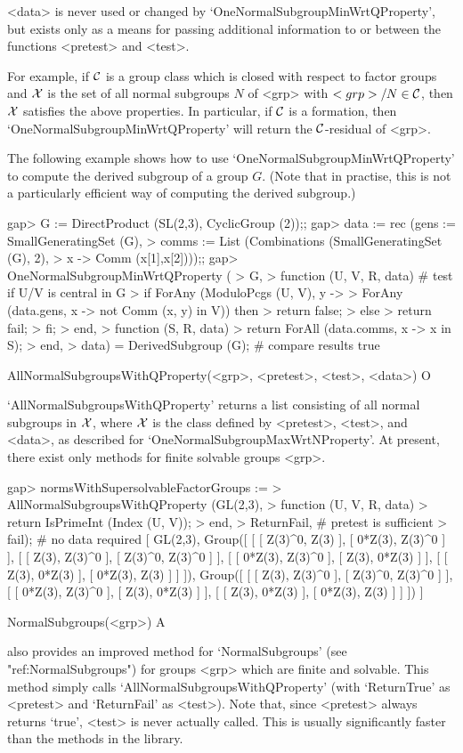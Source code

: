 <data> is never used or changed by `OneNormalSubgroupMinWrtQProperty', but
exists only as a means for passing additional information to or between
the functions <pretest> and <test>.

For example, if $\cal C$ is a group class which is closed with respect to
factor groups and $\cal X$ is the set of all normal subgroups $N$ of <grp>
with $<grp>/N \in \cal C$, then $\cal X$ satisfies the above properties. In
particular, if $\cal C$ is a formation, then
`OneNormalSubgroupMinWrtQProperty' will return the $\cal C$-residual of
<grp>.

The following example shows how to use `OneNormalSubgroupMinWrtQProperty' to
compute the derived subgroup of a group $G$. (Note that in practise, this 
is not a particularly efficient way of computing the derived subgroup.)

\beginexample
gap> G := DirectProduct (SL(2,3), CyclicGroup (2));;
gap> data := rec (gens := SmallGeneratingSet (G),
>    comms := List (Combinations (SmallGeneratingSet (G), 2), 
>       x -> Comm (x[1],x[2])));;
gap> OneNormalSubgroupMinWrtQProperty (
>    G,
>    function (U, V, R, data) # test if U/V is central in G
>        if ForAny (ModuloPcgs (U, V), y ->
>           ForAny (data.gens, x -> not Comm (x, y) in V)) then 
>           return false;
>        else
>           return fail;
>        fi;
>     end,
>     function (S, R, data)
>        return ForAll (data.comms, x -> x in S);
>     end,
>     data) = DerivedSubgroup (G); # compare results
true
\endexample       

\>AllNormalSubgroupsWithQProperty(<grp>, <pretest>, <test>, <data>) O

`AllNormalSubgroupsWithQProperty' returns a list consisting of all normal
subgroups in $\cal X$, where $\cal X$ is the class defined by <pretest>,
<test>, and <data>, as described for `OneNormalSubgroupMaxWrtNProperty'. 
At present, there exist only methods for finite solvable groups <grp>.

\beginexample
gap> normsWithSupersolvableFactorGroups :=
> AllNormalSubgroupsWithQProperty (GL(2,3),
>    function (U, V, R, data)
>       return IsPrimeInt (Index (U, V));
>    end,
>    ReturnFail, # pretest is sufficient
>    fail); # no data required
[ GL(2,3), 
  Group([ [ [ Z(3)^0, Z(3) ], [ 0*Z(3), Z(3)^0 ] ], [ [ Z(3), Z(3)^0 ], 
          [ Z(3)^0, Z(3)^0 ] ], [ [ 0*Z(3), Z(3)^0 ], [ Z(3), 0*Z(3) ] ], 
      [ [ Z(3), 0*Z(3) ], [ 0*Z(3), Z(3) ] ] ]), 
  Group([ [ [ Z(3), Z(3)^0 ], [ Z(3)^0, Z(3)^0 ] ], 
      [ [ 0*Z(3), Z(3)^0 ], [ Z(3), 0*Z(3) ] ], 
      [ [ Z(3), 0*Z(3) ], [ 0*Z(3), Z(3) ] ] ]) ]
\endexample

\>NormalSubgroups(<grp>) A

{\CRISP} also provides an improved method for `NormalSubgroups' (see
"ref:NormalSubgroups") for groups <grp> which are finite and  solvable.
This method simply calls `AllNormalSubgroupsWithQProperty' (with `ReturnTrue'
as <pretest> and `ReturnFail' as <test>). Note that, since
<pretest> always returns `true', <test> is never actually called.
This is usually significantly faster than the methods in the {\GAP} library.


